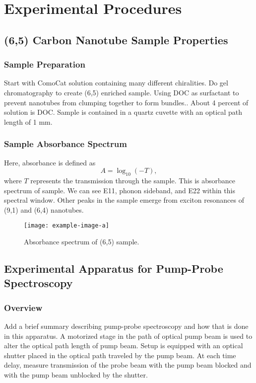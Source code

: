\chapter{Experimental Procedures}

\section{(6,5) Carbon Nanotube Sample Properties}

\subsection{Sample Preparation}
Start with ComoCat solution containing many different chiralities. Do gel chromatography to create (6,5) enriched sample. Using DOC as surfactant to prevent nanotubes from clumping together to form bundles.. About 4 percent of solution is DOC. Sample is contained in a quartz cuvette with an optical path length of 1 mm.

\subsection{Sample Absorbance Spectrum}

Here, absorbance is defined as 
\begin{equation}
A = \log_{10}(-T),
\end{equation}
where $T$ represents the transmission through the sample. 
This is absorbance spectrum of sample. We can see E11, phonon sideband, and E22 within this spectral window. Other peaks in the sample emerge from exciton resonances of (9,1) and (6,4) nanotubes.

\begin{figure}[h]
	\centering
	\texttt{[image: example-image-a]}
	\caption{ Absorbance spectrum of (6,5) sample.}
	\label{fig:sample_absorbance}
\end{figure}

\section{Experimental Apparatus for Pump-Probe Spectroscopy}

\subsection{Overview}
{\color{red} Add a brief summary describing pump-probe spectroscopy and how that is done in this apparatus}.
A motorized stage in the path of optical pump beam is used to alter the optical path length of pump beam. 
Setup is equipped with an optical shutter placed in the optical path traveled by the pump beam. At each time delay, measure transmission of the probe beam with the pump beam blocked and with the pump beam unblocked by the shutter.  

